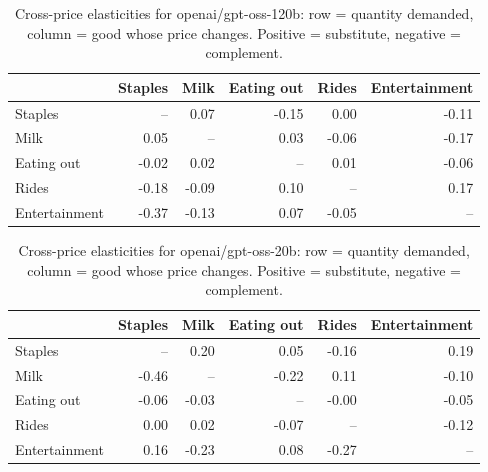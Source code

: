 \begin{table}[!htbp]\centering\small
\caption{Cross-price elasticities for openai/gpt-oss-120b: row = quantity demanded, column = good whose price changes. Positive = substitute, negative = complement.}\label{tab:cross_price_openai_gpt_oss_120b}
\begin{tabular}{lrrrrr}
\hline
 & Staples & Milk & Eating out & Rides & Entertainment \\ \hline
Staples & -- & 0.07 & -0.15 & 0.00 & -0.11 \\
Milk & 0.05 & -- & 0.03 & -0.06 & -0.17 \\
Eating out & -0.02 & 0.02 & -- & 0.01 & -0.06 \\
Rides & -0.18 & -0.09 & 0.10 & -- & 0.17 \\
Entertainment & -0.37 & -0.13 & 0.07 & -0.05 & -- \\
\hline
\end{tabular}
\end{table}
\begin{table}[!htbp]\centering\small
\caption{Cross-price elasticities for openai/gpt-oss-20b: row = quantity demanded, column = good whose price changes. Positive = substitute, negative = complement.}\label{tab:cross_price_openai_gpt_oss_20b}
\begin{tabular}{lrrrrr}
\hline
 & Staples & Milk & Eating out & Rides & Entertainment \\ \hline
Staples & -- & 0.20 & 0.05 & -0.16 & 0.19 \\
Milk & -0.46 & -- & -0.22 & 0.11 & -0.10 \\
Eating out & -0.06 & -0.03 & -- & -0.00 & -0.05 \\
Rides & 0.00 & 0.02 & -0.07 & -- & -0.12 \\
Entertainment & 0.16 & -0.23 & 0.08 & -0.27 & -- \\
\hline
\end{tabular}
\end{table}